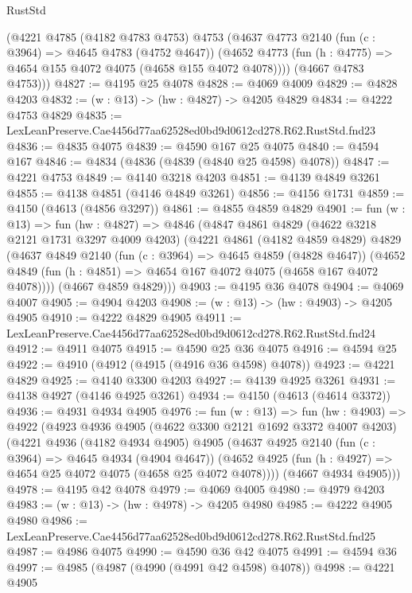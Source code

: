 \begin{lexlean}{RustStd}
\begin{coremodule}
      (@4221
        @4785
        (@4182 @4783 @4753)
        @4753
        (@4637
          @4773
          @2140
          (fun (c : @3964) => @4645 @4783 (@4752 @4647))
          (@4652 @4773 (fun (h : @4775) => @4654 @155 @4072 @4075 (@4658 @155 @4072 @4078))))
        (@4667 @4783 @4753)))
@4827 := @4195 @25 @4078
@4828 := @4069 @4009
@4829 := @4828 @4203
@4832 := (w : @13) -> (hw : @4827) -> @4205 @4829
@4834 := @4222 @4753 @4829
@4835 := LexLeanPreserve.Cae4456d77aa62528ed0bd9d0612cd278.R62.RustStd.fnd23
@4836 := @4835 @4075
@4839 := @4590 @167 @25 @4075
@4840 := @4594 @167
@4846 := @4834 (@4836 (@4839 (@4840 @25 @4598) @4078))
@4847 := @4221 @4753
@4849 := @4140 @3218 @4203
@4851 := @4139 @4849 @3261
@4855 := @4138 @4851 (@4146 @4849 @3261)
@4856 := @4156 @1731
@4859 := @4150 (@4613 (@4856 @3297))
@4861 := @4855 @4859 @4829
@4901 := fun (w : @13) =>
  fun (hw : @4827) =>
  @4846
    (@4847
      @4861
      @4829
      (@4622 @3218 @2121 @1731 @3297 @4009 @4203)
      (@4221
        @4861
        (@4182 @4859 @4829)
        @4829
        (@4637
          @4849
          @2140
          (fun (c : @3964) => @4645 @4859 (@4828 @4647))
          (@4652 @4849 (fun (h : @4851) => @4654 @167 @4072 @4075 (@4658 @167 @4072 @4078))))
        (@4667 @4859 @4829)))
@4903 := @4195 @36 @4078
@4904 := @4069 @4007
@4905 := @4904 @4203
@4908 := (w : @13) -> (hw : @4903) -> @4205 @4905
@4910 := @4222 @4829 @4905
@4911 := LexLeanPreserve.Cae4456d77aa62528ed0bd9d0612cd278.R62.RustStd.fnd24
@4912 := @4911 @4075
@4915 := @4590 @25 @36 @4075
@4916 := @4594 @25
@4922 := @4910 (@4912 (@4915 (@4916 @36 @4598) @4078))
@4923 := @4221 @4829
@4925 := @4140 @3300 @4203
@4927 := @4139 @4925 @3261
@4931 := @4138 @4927 (@4146 @4925 @3261)
@4934 := @4150 (@4613 (@4614 @3372))
@4936 := @4931 @4934 @4905
@4976 := fun (w : @13) =>
  fun (hw : @4903) =>
  @4922
    (@4923
      @4936
      @4905
      (@4622 @3300 @2121 @1692 @3372 @4007 @4203)
      (@4221
        @4936
        (@4182 @4934 @4905)
        @4905
        (@4637
          @4925
          @2140
          (fun (c : @3964) => @4645 @4934 (@4904 @4647))
          (@4652 @4925 (fun (h : @4927) => @4654 @25 @4072 @4075 (@4658 @25 @4072 @4078))))
        (@4667 @4934 @4905)))
@4978 := @4195 @42 @4078
@4979 := @4069 @4005
@4980 := @4979 @4203
@4983 := (w : @13) -> (hw : @4978) -> @4205 @4980
@4985 := @4222 @4905 @4980
@4986 := LexLeanPreserve.Cae4456d77aa62528ed0bd9d0612cd278.R62.RustStd.fnd25
@4987 := @4986 @4075
@4990 := @4590 @36 @42 @4075
@4991 := @4594 @36
@4997 := @4985 (@4987 (@4990 (@4991 @42 @4598) @4078))
@4998 := @4221 @4905

\end{coremodule}
\end{lexlean}
